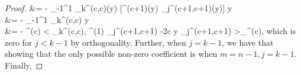 \begin{proof}
{	&= - \int_{-1}^1 \: \jac_k^{(c,c)}(y) \:  [\jacw^{(c+1)}(y) \: \jac_{j}^{(c+1,c+1)}(y)] \: \D y \\
	&= - \int_{-1}^1 \: \jac_k^{(c,c)}  \: \D y \\
	&= - \: \normjac^{(c)} \: \ip< \jac_k^{(c,c)}, \: \jacw^{(1)} \: \jac_{j}^{(c+1,c+1) \: \prime} -2c \:y \: \jac_{j}^{(c+1,c+1)} >_{\jacw^{(c)}},
}
which is zero for $j < k-1$ by orthogonality. Further, when $j = k-1$, we have that
showing that the only possible non-zero coefficient is when $m=n-1, j=k-1$. Finally,


\end{proof}
